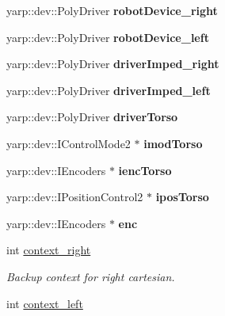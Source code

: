 \begin{DoxyCompactItemize}
\item 
yarp\+::dev\+::\+Poly\+Driver {\bfseries robot\+Device\+\_\+right}\label{classGraspExecution_af1f98094e942e01dc5276ada61a8bf79}

\item 
yarp\+::dev\+::\+Poly\+Driver {\bfseries robot\+Device\+\_\+left}\label{classGraspExecution_ae92b996c91a68f9d918e395f57d5f0ef}

\item 
yarp\+::dev\+::\+Poly\+Driver {\bfseries driver\+Imped\+\_\+right}\label{classGraspExecution_aaaa42876d68ef3996cecf989dcc9e27c}

\item 
yarp\+::dev\+::\+Poly\+Driver {\bfseries driver\+Imped\+\_\+left}\label{classGraspExecution_a6696b1f3457173b856494f6ad0843f2f}

\item 
yarp\+::dev\+::\+Poly\+Driver {\bfseries driver\+Torso}\label{classGraspExecution_a0b1f4780bfcf0ef62e4063a36c43429f}

\item 
yarp\+::dev\+::\+I\+Control\+Mode2 $\ast$ {\bfseries imod\+Torso}\label{classGraspExecution_a009a185d69d7dbae7741091703c4beca}

\item 
yarp\+::dev\+::\+I\+Encoders $\ast$ {\bfseries ienc\+Torso}\label{classGraspExecution_a37f02113f5df20eaf639d3de5f50201a}

\item 
yarp\+::dev\+::\+I\+Position\+Control2 $\ast$ {\bfseries ipos\+Torso}\label{classGraspExecution_acd38eb6d7a7a592af60f056fc3558e8b}

\item 
yarp\+::dev\+::\+I\+Encoders $\ast$ {\bfseries enc}\label{classGraspExecution_a19645dbad457efb2f59659cd9d7716e1}

\item 
int \hyperlink{classGraspExecution_a0617f4bf93413fd67d7ea0d86dc9898c}{context\+\_\+right}\label{classGraspExecution_a0617f4bf93413fd67d7ea0d86dc9898c}

\begin{DoxyCompactList}\small\item\em Backup context for right cartesian. \end{DoxyCompactList}\item 
int \hyperlink{classGraspExecution_a5f50814446b2f0d15f7aa0b3cb036d3f}{context\+\_\+left}\label{classGraspExecution_a5f50814446b2f0d15f7aa0b3cb036d3f}


\end{DoxyCompactItemize}

